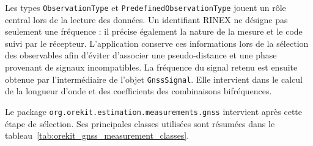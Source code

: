 Les types \texttt{ObservationType} et \texttt{PredefinedObservationType}
jouent un rôle central lors de la lecture des données. Un identifiant RINEX ne
désigne pas seulement une fréquence : il précise également la nature de la
mesure et le code suivi par le récepteur. L'application conserve ces
informations lors de la sélection des observables afin d'éviter d'associer une
pseudo-distance et une phase provenant de signaux incompatibles. La fréquence
du signal retenu est ensuite obtenue par l'intermédiaire de l'objet
\texttt{GnssSignal}. Elle intervient dans le calcul de la longueur d'onde et
des coefficients des combinaisons bifréquences.

Le package \texttt{org.orekit.estimation.measurements.gnss} intervient après
cette étape de sélection. Ses principales classes utilisées sont résumées dans
le tableau~\ref{tab:orekit_gnss_measurement_classes}.

